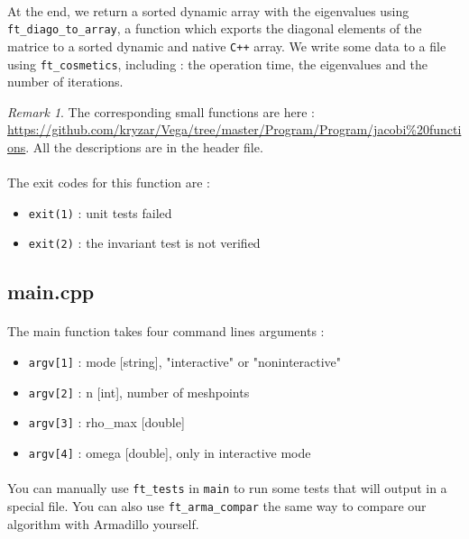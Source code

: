 \documentclass[a4paper, twoside, 11pt]{report}
\theoremstyle{theorem}
\theoremstyle{remark}
\newtheorem{remark}{Remark}[chapter]
\theoremstyle{exemple}
\begin{document}
			\paragraph{}At the end, we return a sorted dynamic array with the eigenvalues using \texttt{ft\_diago\_to\_array}, a function which exports the diagonal elements of the matrice to a sorted dynamic and native \verb!C++! array. We write some data to a file using \texttt{ft\_cosmetics}, including : the operation time, the eigenvalues and the number of iterations.
		
			\begin{remark}
		   	 The corresponding small functions are here : \url{https://github.com/kryzar/Vega/tree/master/Program/Program/jacobi\%20functions}. All the descriptions are in the header file.
			\end{remark}
			
			\paragraph{}The exit codes for this function are : 
				\begin{itemize}
				\setlength\itemsep{0em}
					\item{\texttt{exit(1)} : unit tests failed}
					\item{\texttt{exit(2)} : the invariant test is not verified}
				\end{itemize}
				
		\subsection{main.cpp}
		
			\paragraph{}The main function takes four command lines arguments : 
				\begin{itemize}				
				\setlength\itemsep{0em}
					\item{\texttt{argv[1]} : mode [string], "interactive" or "noninteractive"}
    				\item{\texttt{argv[2]} : n [int], number of meshpoints}
    				\item{\texttt{argv[3]} : rho\_max [double]}
    				\item{\texttt{argv[4]} : omega [double], only in interactive mode}
				\end{itemize}
			
			\paragraph{}You can manually use \texttt{ft\_tests} in \texttt{main} to run some tests that will output in a special file. You can also use \texttt{ft\_arma\_compar} the same way to compare our algorithm with Armadillo yourself.
		
\end{document}
